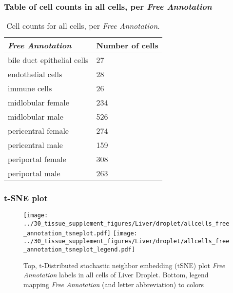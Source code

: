 \subsubsection{Table of cell counts in all cells, per \emph{Free Annotation}}\begin{table}[h]
\centering
\label{my-label}
\begin{tabular}{@{}ll@{}}
\toprule

\emph{Free Annotation}& Number of cells \\ \midrule
bile duct epithelial cells & 27 \\

endothelial cells & 28 \\

immune cells & 26 \\

midlobular female & 234 \\

midlobular male & 526 \\

pericentral female & 274 \\

pericentral male & 159 \\

periportal female & 308 \\

periportal male & 263 \\
\bottomrule
\end{tabular}
\caption{Cell counts for all cells, per \emph{Free Annotation}.}
\end{table}

\clearpage
\subsubsection{t-SNE plot}
\begin{figure}[h]
\centering
\texttt{[image: ../30\_tissue\_supplement\_figures/Liver/droplet/allcells\_free\_annotation\_tsneplot.pdf]}
\texttt{[image: ../30\_tissue\_supplement\_figures/Liver/droplet/allcells\_free\_annotation\_tsneplot\_legend.pdf]}
\caption{Top, t-Distributed stochastic neighbor embedding (tSNE) plot  \emph{Free Annotation} labels in all cells of Liver Droplet. Bottom, legend mapping \emph{Free Annotation} (and letter abbreviation) to colors}
\end{figure}


\clearpage

